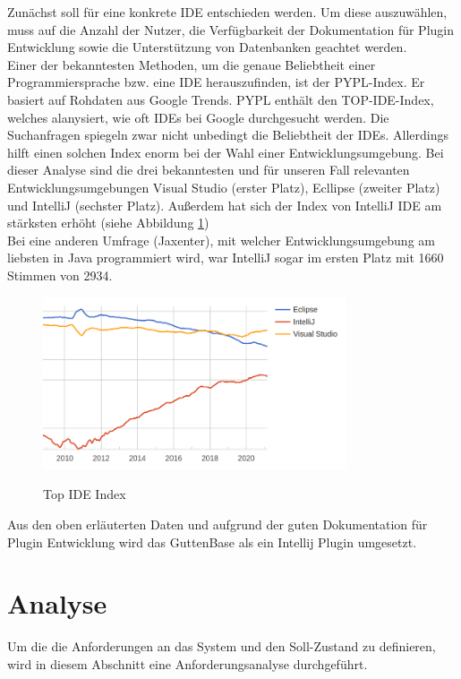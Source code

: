 Zunächst soll für eine konkrete IDE entschieden werden. Um diese auszuwählen, muss auf die Anzahl der Nutzer, die Verfügbarkeit der Dokumentation für Plugin Entwicklung sowie die Unterstützung von Datenbanken geachtet werden.\\
Einer der bekanntesten Methoden, um die genaue Beliebtheit einer Programmiersprache bzw. eine IDE herauszufinden, ist der PYPL-Index. Er basiert auf Rohdaten aus Google Trends. PYPL enthält den TOP-IDE-Index, welches alanysiert, wie oft IDEs bei Google durchgesucht werden. Die Suchanfragen spiegeln zwar nicht unbedingt die Beliebtheit der IDEs. Allerdings hilft einen solchen Index enorm bei der Wahl einer Entwicklungsumgebung.
Bei dieser Analyse sind die drei bekanntesten und für unseren Fall relevanten Entwicklungsumgebungen Visual Studio (erster Platz), Ecllipse (zweiter Platz) und IntelliJ (sechster Platz). Außerdem hat sich der Index von IntelliJ IDE am stärksten erhöht (siehe Abbildung \ref{img:ide-index})\\
Bei eine anderen Umfrage (Jaxenter), mit welcher Entwicklungsumgebung am liebsten in Java programmiert wird, war IntelliJ sogar im ersten Platz mit 1660 Stimmen von 2934. \\

\begin{figure}[H]
	\caption{Top IDE Index}
	\centering
	\includegraphics[width=0.8\textwidth]{images/ide-index}
	\label{img:ide-index}
\end{figure}
Aus den oben erläuterten Daten und aufgrund der guten Dokumentation für Plugin Entwicklung wird das GuttenBase als ein Intellij Plugin umgesetzt. 



\section{Analyse}
\label{anaylse}
Um die die Anforderungen an das System und den Soll-Zustand zu definieren, wird in diesem Abschnitt eine Anforderungsanalyse durchgeführt. 


